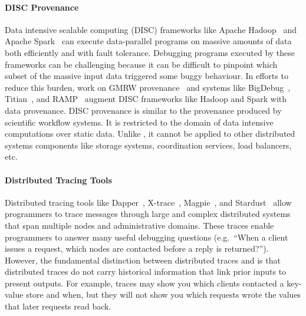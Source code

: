 \paragraph{DISC Provenance}
Data intensive scalable computing (DISC) frameworks like Apache
Hadoop~\cite{shvachko2010hadoop} and Apache Spark~\cite{zaharia2010spark} can
execute data-parallel programs on massive amounts of data both efficiently and
with fault tolerance. Debugging programs executed by these frameworks can be
challenging because it can be difficult to pinpoint which subset of the massive
input data triggered some buggy behaviour. In efforts to reduce this burden,
work on GMRW provenance~\cite{ikeda2011provenance} and systems like
BigDebug~\cite{gulzar2016bigdebug}, Titian~\cite{interlandi2015titian}, and
RAMP~\cite{park2011ramp} augment DISC frameworks like Hadoop and Spark with
data provenance. DISC provenance is similar to the provenance produced by
scientific workflow systems. It is restricted to the domain of data intensive
computations over static data.  Unlike \watprovenance{}, it cannot be applied
to other distributed systems components like storage systems, coordination
services, load balancers, etc.

\paragraph{Distributed Tracing Tools}
Distributed tracing tools like Dapper~\cite{sigelman2010dapper},
X-trace~\cite{fonseca2007x}, Magpie~\cite{barham2003magpie}, and
Stardust~\cite{thereska2006stardust} allow programmers to trace messages
through large and complex distributed systems that span multiple nodes and
administrative domains. These traces enable programmers to answer many useful
debugging questions (e.g.\ ``When a client issues a request, which nodes are
contacted before a reply is returned?''). However, the fundamental distinction
between distributed traces and \watprovenance{} is that distributed traces do
not carry historical information that link prior inputs to present outputs.
For example, traces may show you which clients contacted a key-value store and
when, but they will not show you which requests wrote the values that later
requests read back.

